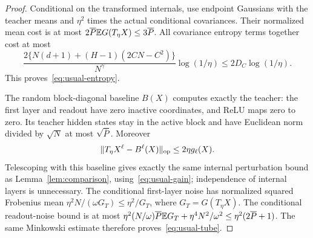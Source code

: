 \begin{proof}
Conditional on the transformed internals, use endpoint Gaussians with the teacher means and $\eta^2$ times the actual conditional covariances. Their normalized mean cost is at most $2\overline P\mathbb E G(T_\eta X)\le3\overline P$. All covariance entropy terms together cost at most
\[
 \frac{2\{N(d+1)+(H-1)(2CN-C^2)\}}{N^\gamma}\log(1/\eta)
 \le2D_C\log(1/\eta).
\]
This proves~\eqref{eq:usual-entropy}.

The random block-diagonal baseline $B(X)$ computes exactly the teacher: the first layer and readout have zero inactive coordinates, and ReLU maps zero to zero. Its teacher hidden states stay in the active block and have Euclidean norm divided by $\sqrt N$ at most $\sqrt{\overline P}$. Moreover
\[
 \|T_\eta X^\ell-B^\ell(X)\|_{\mathrm{op}}
 \le2\eta g_\ell(X).
\]
Telescoping with this baseline gives exactly the same internal perturbation bound as Lemma~\ref{lem:comparison}, using~\eqref{eq:usual-gain}; independence of internal layers is unnecessary. The conditional first-layer noise has normalized squared Frobenius mean $\eta^2N/(\omega G_T)\le\eta^2/G_T$, where $G_T=G(T_\eta X)$. The conditional readout-noise bound is at most
$\eta^2(N/\omega)\overline P\mathbb E G_T+\eta^4N^2/\omega^2\le\eta^2(2\overline P+1)$.
The same Minkowski estimate therefore proves~\eqref{eq:usual-tube}.
\end{proof}

